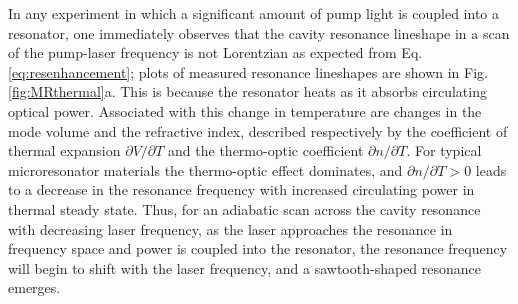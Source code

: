 In any experiment in which a significant amount of pump light is coupled into a resonator, one immediately observes that the cavity resonance lineshape in a scan of the pump-laser frequency is not Lorentzian as expected from Eq. \ref{eq:resenhancement}; plots of measured resonance lineshapes are shown in Fig. \ref{fig:MRthermal}a. This is because the resonator heats as it absorbs circulating optical power. Associated with this change in temperature are changes in the mode volume and the refractive index, described respectively by the coefficient of thermal expansion $\partial V/\partial T$ and the thermo-optic coefficient $\partial n/\partial T$. For typical microresonator materials the thermo-optic effect dominates, and $\partial n/\partial T>0$ leads to a decrease in the resonance frequency with increased circulating power in thermal steady state. Thus, for an adiabatic scan across the cavity resonance with decreasing laser frequency, as the laser approaches the resonance in frequency space and power is coupled into the resonator, the resonance frequency will begin to shift with the laser frequency, and a sawtooth-shaped resonance emerges.



